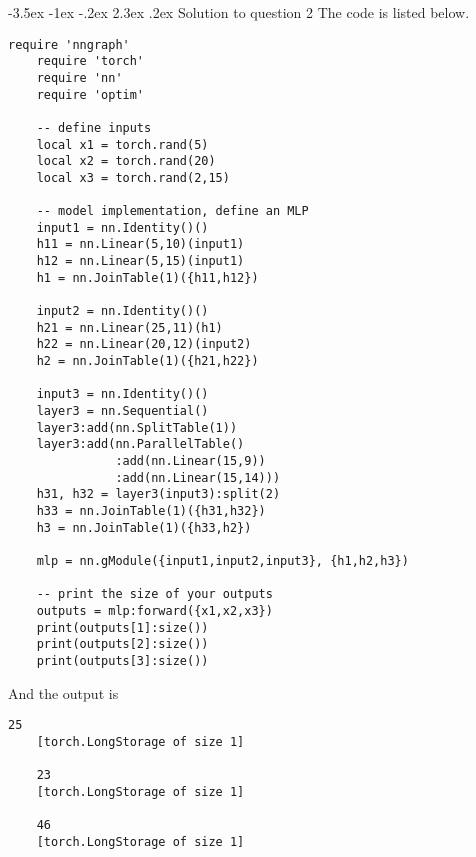 \documentclass[12pt]{article}
\makeatletter
\renewcommand\section{\@startsection {section}{1}{\z@}%
	{-3.5ex \@plus -1ex \@minus -.2ex}%
	{2.3ex \@plus.2ex}%
	{\normalfont\large\bfseries}}%
\makeatother
\begin{document}
	\section{Solution to question 2}
	The code is listed below.
	\lstset{language=[5.0]Lua}
	\lstset{frame=lines}
	\lstset{basicstyle=\footnotesize\ttfamily}
	\begin{lstlisting}[breaklines=true]
	require 'nngraph'
	require 'torch'
	require 'nn'   
	require 'optim'
	
	-- define inputs
	local x1 = torch.rand(5)
	local x2 = torch.rand(20)
	local x3 = torch.rand(2,15)
	
	-- model implementation, define an MLP
	input1 = nn.Identity()()
	h11 = nn.Linear(5,10)(input1)
	h12 = nn.Linear(5,15)(input1)
	h1 = nn.JoinTable(1)({h11,h12})
	
	input2 = nn.Identity()()
	h21 = nn.Linear(25,11)(h1)
	h22 = nn.Linear(20,12)(input2)
	h2 = nn.JoinTable(1)({h21,h22})
	
	input3 = nn.Identity()()
	layer3 = nn.Sequential()
	layer3:add(nn.SplitTable(1))
	layer3:add(nn.ParallelTable()
	           :add(nn.Linear(15,9))
	           :add(nn.Linear(15,14)))
	h31, h32 = layer3(input3):split(2)
	h33 = nn.JoinTable(1)({h31,h32})
	h3 = nn.JoinTable(1)({h33,h2})
	
	mlp = nn.gModule({input1,input2,input3}, {h1,h2,h3})
	
	-- print the size of your outputs
	outputs = mlp:forward({x1,x2,x3})
	print(outputs[1]:size())
	print(outputs[2]:size())
	print(outputs[3]:size())
	\end{lstlisting}
	And the output is
	\begin{lstlisting}[breaklines=true]
	25
	[torch.LongStorage of size 1]
	
	23
	[torch.LongStorage of size 1]
	
	46
	[torch.LongStorage of size 1]
	
	\end{lstlisting}	
	

	
	
\end{document}
